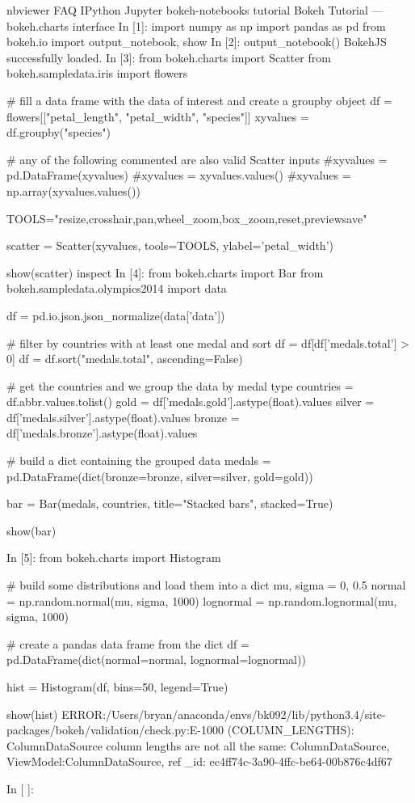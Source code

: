 nbviewer
FAQ
IPython
Jupyter
bokeh-notebooks   tutorial
Bokeh Tutorial — bokeh.charts interface
In [1]:
import numpy as np
import pandas as pd
from bokeh.io import output_notebook, show
In [2]:
output_notebook()
BokehJS successfully loaded.
In [3]:
from bokeh.charts import Scatter
from bokeh.sampledata.iris import flowers

# fill a data frame with the data of interest and create a groupby object
df = flowers[["petal_length", "petal_width", "species"]]
xyvalues = df.groupby("species")

# any of the following commented are also valid Scatter inputs
#xyvalues = pd.DataFrame(xyvalues)
#xyvalues = xyvalues.values()
#xyvalues = np.array(xyvalues.values())

TOOLS="resize,crosshair,pan,wheel_zoom,box_zoom,reset,previewsave"

scatter = Scatter(xyvalues, tools=TOOLS, ylabel='petal_width')

show(scatter)
inspect 	
In [4]:
from bokeh.charts import Bar
from bokeh.sampledata.olympics2014 import data

df = pd.io.json.json_normalize(data['data'])

# filter by countries with at least one medal and sort
df = df[df['medals.total'] > 0]
df = df.sort("medals.total", ascending=False)

# get the countries and we group the data by medal type
countries = df.abbr.values.tolist()
gold = df['medals.gold'].astype(float).values
silver = df['medals.silver'].astype(float).values
bronze = df['medals.bronze'].astype(float).values

# build a dict containing the grouped data
medals = pd.DataFrame(dict(bronze=bronze, silver=silver, gold=gold))

bar = Bar(medals, countries, title="Stacked bars", stacked=True)

show(bar)
	
In [5]:
from bokeh.charts import Histogram

# build some distributions and load them into a dict
mu, sigma = 0, 0.5
normal = np.random.normal(mu, sigma, 1000)
lognormal = np.random.lognormal(mu, sigma, 1000)

# create a pandas data frame from the dict
df = pd.DataFrame(dict(normal=normal, lognormal=lognormal))

hist = Histogram(df, bins=50, legend=True)

show(hist)
ERROR:/Users/bryan/anaconda/envs/bk092/lib/python3.4/site-packages/bokeh/validation/check.py:E-1000 (COLUMN_LENGTHS): ColumnDataSource column lengths are not all the same: ColumnDataSource, ViewModel:ColumnDataSource, ref _id: ec4ff74c-3a90-4ffc-be64-00b876c4df67
	
In [ ]:
 
